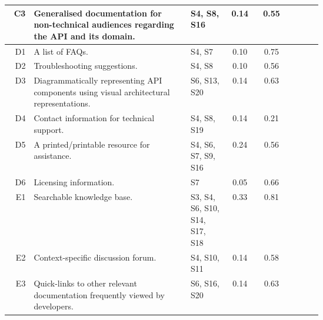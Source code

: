 {{\begin{landscape}
\begin{longtable}{rp{0.5\linewidth}|p{0.125\linewidth}|cc|ccc}
  C3&
  Generalised documentation for non-technical audiences regarding the API and its domain.
  &
  \scriptsize S4, S8, S16 &
  \cellcolor[HTML]{eb9071}0.14&\cellcolor[HTML]{e3d26c}0.55&\circlepresent{}&\circlepresent{}&\circlepresent{}\\

  \midrule
  D1&
  A list of FAQs.
  &
  \scriptsize S4, S7 &
  \cellcolor[HTML]{e88672}0.10&\cellcolor[HTML]{9cc67b}0.75&\circlepresent{}&\circlepresent{}&\circlepresent{}\\

  D2&
  Troubleshooting suggestions.
  &
  \scriptsize S4, S8 &
  \cellcolor[HTML]{e88672}0.10&\cellcolor[HTML]{e0d26c}0.56&\circlenotpresent{}&\circlepartialpresent{}&\circlenotpresent{}\\

  D3&
  Diagrammatically representing API components using visual architectural representations.
  &
  \scriptsize S6, S13, S20 &
  \cellcolor[HTML]{eb9071}0.14&\cellcolor[HTML]{c8ce71}0.63&\circlenotpresent{}&\circlenotpresent{}&\circlenotpresent{}\\

  D4&
  Contact information for technical support.
  &
  \scriptsize S4, S8, S19 &
  \cellcolor[HTML]{eb9071}0.14&\cellcolor[HTML]{ef9e6f}0.21&\circlepresent{}&\circlepresent{}&\circlepresent{}\\

  D5&
  A printed/printable resource for assistance.
  &
  \scriptsize S4, S6, S7, S9, S16 &
  \cellcolor[HTML]{f1a46e}0.24&\cellcolor[HTML]{dfd16d}0.56&\circlenotpresent{}&\circlepresent{}&\circlepresent{}\\

  D6&
  Licensing information.
  &
  \scriptsize S7 &
  \cellcolor[HTML]{e67c73}0.05&\cellcolor[HTML]{bbcc74}0.66&\circlenotpresent{}&\circlenotpresent{}&\circlepartialpresent{}\\

  \midrule
  E1&
  Searchable knowledge base.
  &
  \scriptsize S3, S4, S6, S10, S14, S17, S18 &
  \cellcolor[HTML]{f6b86b}0.33&\cellcolor[HTML]{86c37f}0.81&\circlepresent{}&\circlepresent{}&\circlepresent{}\\

  E2&
  Context-specific discussion forum.
  &
  \scriptsize S4, S10, S11 &
  \cellcolor[HTML]{eb9071}0.14&\cellcolor[HTML]{dad06e}0.58&\circlepresent{}&\circlepresent{}&\circlepartialpresent{}\\

  E3&
  Quick-links to other relevant documentation frequently viewed by developers.
  &
  \scriptsize S6, S16, S20 &
  \cellcolor[HTML]{eb9071}0.14&\cellcolor[HTML]{c8ce71}0.63&\circlenotpresent{}&\circlenotpresent{}&\circlenotpresent{}\\


\end{longtable}
\end{landscape}}}
